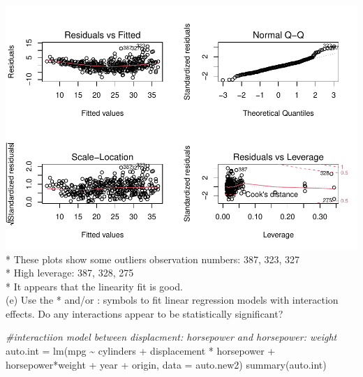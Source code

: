 \documentclass[
]{article}
\newenvironment{Shaded}{\begin{snugshade}}{\end{snugshade}}
\newcommand{\AttributeTok}[1]{\textcolor[rgb]{0.77,0.63,0.00}{#1}}
\newcommand{\CommentTok}[1]{\textcolor[rgb]{0.56,0.35,0.01}{\textit{#1}}}
\newcommand{\FunctionTok}[1]{\textcolor[rgb]{0.00,0.00,0.00}{#1}}
\newcommand{\NormalTok}[1]{#1}
\newcommand{\OtherTok}[1]{\textcolor[rgb]{0.56,0.35,0.01}{#1}}
\newcommand{\SpecialCharTok}[1]{\textcolor[rgb]{0.00,0.00,0.00}{#1}}
\begin{document}
\includegraphics{math4322_fall21_hw2_files/figure-latex/unnamed-chunk-13-1.pdf}
* These plots show some outliers observation numbers: 387, 323, 327\\
* High leverage: 387, 328, 275\\
* It appears that the linearity fit is good.\\
(e) Use the * and/or : symbols to fit linear regression models with
interaction effects. Do any interactions appear to be statistically
significant?

\begin{Shaded}
\begin{Highlighting}[]
\CommentTok{\#interactiion model between displacment: horsepower and horsepower: weight}
\NormalTok{auto.int }\OtherTok{=} \FunctionTok{lm}\NormalTok{(mpg }\SpecialCharTok{\textasciitilde{}}\NormalTok{ cylinders }\SpecialCharTok{+}\NormalTok{ displacement }\SpecialCharTok{*}\NormalTok{ horsepower }\SpecialCharTok{+}\NormalTok{ horsepower}\SpecialCharTok{*}\NormalTok{weight }\SpecialCharTok{+}\NormalTok{ year }\SpecialCharTok{+}\NormalTok{ origin, }\AttributeTok{data =}\NormalTok{ auto.new2)}
\FunctionTok{summary}\NormalTok{(auto.int)}
\end{Highlighting}
\end{Shaded}
\end{document}
